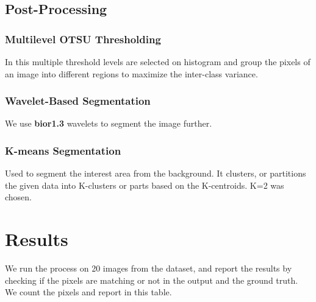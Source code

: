 \documentclass{article}
\begin{document}
\subsection{Post-Processing}

\subsubsection{Multilevel OTSU Thresholding}
In this multiple threshold levels are selected on histogram and group the pixels of an image into different regions to 
maximize the inter-class variance.

\subsubsection{Wavelet-Based Segmentation}
We use \textbf{bior1.3} wavelets to segment the image further.

\subsubsection{K-means Segmentation}
Used to segment the interest area from the background. It clusters, or partitions the given data into K-clusters or parts based on the K-centroids. K=2 was chosen.


\section{Results}
We run the process on 20 images from the dataset, and report the results by checking if the pixels are matching or not in the output and the ground truth. We count the pixels and report in this table.
\end{document}
